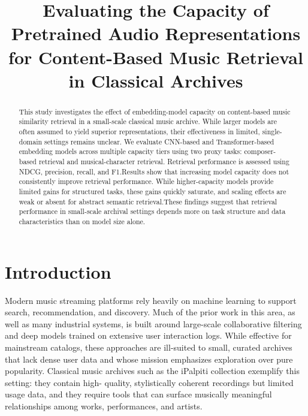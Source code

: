\documentclass{article}
\title{Evaluating the Capacity of Pretrained Audio Representations for Content-Based Music Retrieval in Classical Archives}
\begin{document}
\maketitle

\begin{abstract}
This study investigates the effect of embedding-model capacity on content-based music similarity retrieval 
in a small-scale classical music archive. While larger models are often assumed to yield superior representations, 
their effectiveness in limited, single-domain settings remains unclear. We evaluate CNN-based and Transformer-based 
embedding models across multiple capacity tiers using two proxy tasks: composer-based retrieval and musical-character retrieval. 
Retrieval performance is assessed using NDCG, precision, recall, and F1.Results show that increasing model capacity 
does not consistently improve retrieval performance. While higher-capacity models provide limited gains for structured 
tasks, these gains quickly saturate, and scaling effects are weak or absent for abstract semantic retrieval.These 
findings suggest that retrieval performance in small-scale archival settings depends more on task structure 
and data characteristics than on model size alone.
\end{abstract}

\section{Introduction}\label{sec:introduction}
Modern music streaming platforms rely heavily on machine learning to support search, recommendation,
and discovery.
Much of the prior work in this area, as well as many industrial systems, is built around large-scale
collaborative filtering and deep models trained on extensive user interaction logs.
While effective for mainstream catalogs, these approaches are ill-suited to small, curated archives
that lack dense user data and whose mission emphasizes exploration over pure popularity.
Classical music archives such as the iPalpiti collection exemplify this setting: they contain high-
quality, stylistically coherent recordings but limited usage data, and they require tools that can
surface musically meaningful relationships among works, performances, and artists.
\end{document}
